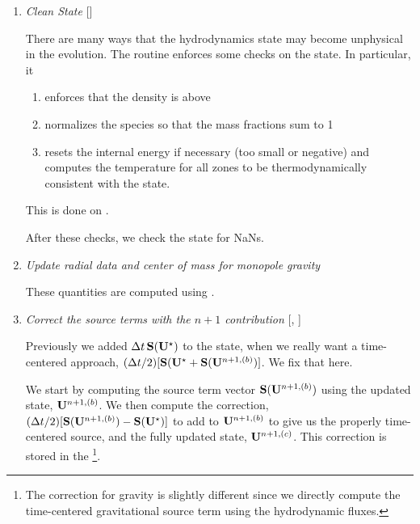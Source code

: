\begin{enumerate}
\begin{enumerate}
  Note: we neglect the reaction source terms, since those are already
  accounted for in the state directly, due to the Strang-splitting
  nature of this method.

  The update computed here is then immediately applied to
  .


  \item method of lines

  \end{enumerate}

\item \label{strang:clean} {\em Clean State} []

  There are many ways that the hydrodynamics state may become
  unphysical in the evolution.  The  routine
  enforces some checks on the state.  In particular, it
  \begin{enumerate}
  \item enforces that the density is above 
  \item normalizes the species so that the mass fractions sum to 1
  \item resets the internal energy if necessary (too small or negative)
    and computes the temperature for all zones to be thermodynamically 
    consistent with the state.
  \end{enumerate}
  This is done on .

  After these checks, we check the state for NaNs.

\item \label{strang:radial} {\em Update radial data and center of mass for monopole gravity}

 These quantities are computed using .



\item \label{strang:newsource} {\em Correct the source terms with the $n+1$ contribution}
  [, ]

  Previously we added $\Delta t\, {\bf S}({\bf U}^\star)$ to the state, when
  we really want a time-centered approach, $(\Delta t/2)[{\bf S}({\bf U}^\star
    + {\bf S}({\bf U}^{n+1,(b)})]$.  We fix that here.

  We start by computing the source term vector ${\bf S}({\bf U}^{n+1,(b)})$
  using the updated state, ${\bf U}^{n+1,(b)}$.  We then compute the
  correction, $(\Delta t/2)[{\bf S}({\bf U}^{n+1,(b)}) - {\bf S}({\bf U}^\star)]$ to
  add to ${\bf U}^{n+1,(b)}$ to give us the properly time-centered source,
  and the fully updated state, ${\bf U}^{n+1,(c)}$.  This correction is stored
  in the  \multifab\footnote{The correction for gravity is slightly different since we directly compute the time-centered gravitational source term using the hydrodynamic fluxes.}.


\end{enumerate}
